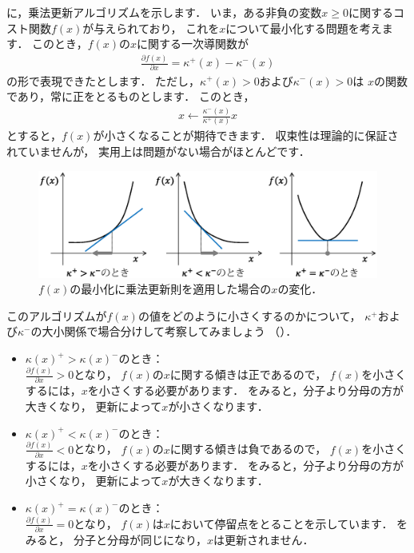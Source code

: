 に，乗法更新アルゴリズムを示します．
いま，ある非負の変数$x \ge 0$に関するコスト関数$f(x)$が与えられており，
これを$x$について最小化する問題を考えます．
このとき，$f(x)$の$x$に関する一次導関数が
\begin{align}
\frac{\partial f(x)}{\partial x} = \kappa^+(x) - \kappa^-(x)
\end{align}
の形で表現できたとします．
ただし，$\kappa^+(x) > 0$および$\kappa^-(x) > 0$は
$x$の関数であり，常に正をとるものとします．
このとき，
\begin{align}
x \gets \frac{\kappa^-(x)}{\kappa^+(x)} x
\label{eq:x_mu_update}
\end{align}
とすると，$f(x)$が小さくなることが期待できます．
収束性は理論的に保証されていませんが，
実用上は問題がない場合がほとんどです．

\begin{figure}[t]
\centering
\includegraphics[width=.99\linewidth]{sections/optimization/multiplicative_update}
\caption{$f(x)$の最小化に乗法更新則を適用した場合の$x$の変化．}
\label{fig:multiplicative_update}
\end{figure}

このアルゴリズムが$f(x)$の値をどのように小さくするのかについて，
$\kappa^+$および$\kappa^-$の大小関係で場合分けして考察してみましょう
（）．
\begin{itemize}
\item
$\kappa(x)^+ > \kappa(x)^-$のとき：\\
$\frac{\partial f(x)}{\partial x} > 0$となり，
$f(x)$の$x$に関する傾きは正であるので，
$f(x)$を小さくするには，$x$を小さくする必要があります．
をみると，分子より分母の方が大きくなり，
更新によって$x$が小さくなります．
\item
$\kappa(x)^+ < \kappa(x)^-$のとき：\\
$\frac{\partial f(x)}{\partial x} < 0$となり，
$f(x)$の$x$に関する傾きは負であるので，
$f(x)$を小さくするには，$x$を小さくする必要があります．
をみると，分子より分母の方が小さくなり，
更新によって$x$が大きくなります．
\item
$\kappa(x)^+ = \kappa(x)^-$のとき：\\
$\frac{\partial f(x)}{\partial x} = 0$となり，
$f(x)$は$x$において停留点をとることを示しています．
をみると，
分子と分母が同じになり，$x$は更新されません．
\end{itemize}

